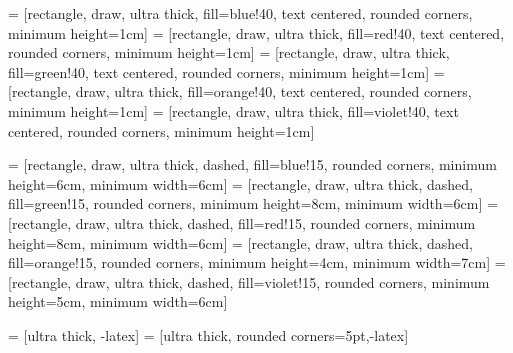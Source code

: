 \documentclass[11pt]{article}
\begin{document}

 = [rectangle, draw, ultra thick, fill=blue!40, 
    text centered, rounded corners, minimum height=1cm]
 = [rectangle, draw, ultra thick, fill=red!40, 
    text centered, rounded corners, minimum height=1cm]
 = [rectangle, draw, ultra thick, fill=green!40, 
    text centered, rounded corners, minimum height=1cm]
 = [rectangle, draw, ultra thick, fill=orange!40, 
    text centered, rounded corners, minimum height=1cm]
 = [rectangle, draw, ultra thick, fill=violet!40, 
    text centered, rounded corners, minimum height=1cm]

 = [rectangle, draw, ultra thick, dashed, 
    fill=blue!15, rounded corners, minimum height=6cm, minimum width=6cm]
 = [rectangle, draw, ultra thick, dashed, 
    fill=green!15, rounded corners, minimum height=8cm, minimum width=6cm]
 = [rectangle, draw, ultra thick, dashed, 
    fill=red!15, rounded corners, minimum height=8cm, minimum width=6cm]
 = [rectangle, draw, ultra thick, dashed, 
    fill=orange!15, rounded corners, minimum height=4cm, minimum width=7cm]
 = [rectangle, draw, ultra thick, dashed, 
    fill=violet!15, rounded corners, minimum height=5cm, minimum width=6cm]

 = [ultra thick, -latex]
 = [ultra thick, rounded corners=5pt,-latex]

\vspace*{\fill}
\end{document}
